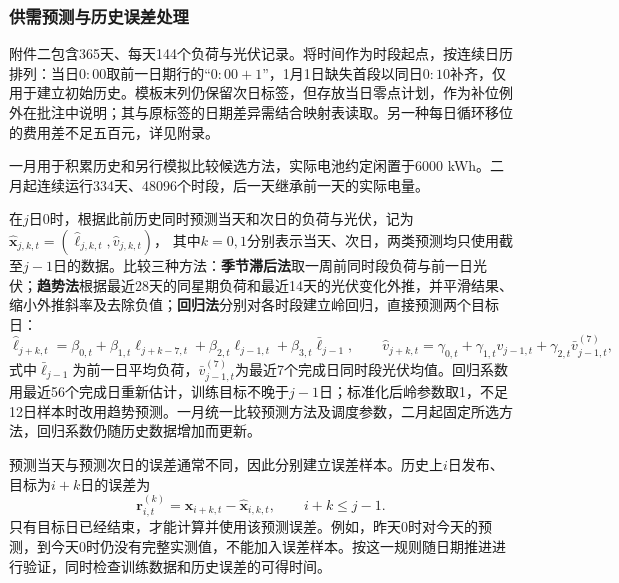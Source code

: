 


\subsubsection{供需预测与历史误差处理}

附件二包含365天、每天144个负荷与光伏记录。将时间作为时段起点，按连续日历排列：当日$0{:}00$取前一日期行的“$0{:}00{+}1$”，1月1日缺失首段以同日$0{:}10$补齐，仅用于建立初始历史。模板末列仍保留次日标签，但存放当日零点计划，作为补位例外在批注中说明；其与原标签的日期差异需结合映射表读取。另一种每日循环移位的费用差不足五百元，详见附录。\par 一月用于积累历史和另行模拟比较候选方法，实际电池约定闲置于6000 kWh。二月起连续运行334天、48096个时段，后一天继承前一天的实际电量。

在$j$日0时，根据此前历史同时预测当天和次日的负荷与光伏，记为
$\hat{\boldsymbol x}_{j,k,t}=(\hat\ell_{j,k,t},\hat v_{j,k,t})$，
其中$k=0,1$分别表示当天、次日，两类预测均只使用截至$j-1$日的数据。比较三种方法：\textbf{季节滞后法}取一周前同时段负荷与前一日光伏；\textbf{趋势法}根据最近28天的同星期负荷和最近14天的光伏变化外推，并平滑结果、缩小外推斜率及去除负值；\textbf{回归法}分别对各时段建立岭回归，直接预测两个目标日\cite{fpp-regression}：
\begin{equation}
 \hat\ell_{j+k,t}=\beta_{0,t}+\beta_{1,t}\ell_{j+k-7,t}+\beta_{2,t}\ell_{j-1,t}+\beta_{3,t}\bar\ell_{j-1},\qquad
 \hat v_{j+k,t}=\gamma_{0,t}+\gamma_{1,t}v_{j-1,t}+\gamma_{2,t}\bar v^{(7)}_{j-1,t},
 \label{eq:q2-regression}
\end{equation}
式中$\bar\ell_{j-1}$为前一日平均负荷，$\bar v^{(7)}_{j-1,t}$为最近7个完成日同时段光伏均值。回归系数用最近56个完成日重新估计，训练目标不晚于$j-1$日；标准化后岭参数取1，不足12日样本时改用趋势预测。一月统一比较预测方法及调度参数，二月起固定所选方法，回归系数仍随历史数据增加而更新。

预测当天与预测次日的误差通常不同，因此分别建立误差样本。历史上$i$日发布、目标为$i+k$日的误差为
\begin{equation}
 \boldsymbol r^{(k)}_{i,t}=\boldsymbol x_{i+k,t}-\hat{\boldsymbol x}_{i,k,t},
 \qquad i+k\le j-1.
 \label{eq:q2-matured-error}
\end{equation}
只有目标日已经结束，才能计算并使用该预测误差。例如，昨天0时对今天的预测，到今天0时仍没有完整实测值，不能加入误差样本。按这一规则随日期推进进行验证，同时检查训练数据和历史误差的可得时间\cite{fpp-tscv}。


